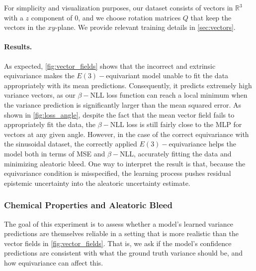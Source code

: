 \documentclass[10pt]{article} %
\theoremstyle{definition}
\begin{document}
For simplicity and visualization purposes,  our dataset consists of vectors in $\mathbb{R}^3$ with a $z$ component of $0$, and we choose rotation matrices $Q$ that keep the vectors in the $xy$-plane. We provide relevant training details in \cref{sec:vectors}.

\paragraph{Results.} As expected, \cref{fig:vector_fields} shows that the incorrect and extrinsic equivariance makes the $E(3)-$equivariant model unable to fit the data appropriately with its mean predictions. Consequently, it predicts extremely high variance vectors, as our $\beta-$NLL loss function can reach a local minimum when the variance prediction is significantly larger than the mean squared error. As shown in \cref{fig:loss_angle}, despite the fact that the mean vector field fails to appropriately fit the data, the $\beta-$NLL loss is still fairly close to the MLP for vectors at any given angle. However, in the case of the correct equivariance with the sinusoidal dataset, the correctly applied $E(3)-$equivariance helps the model both in terms of MSE and $\beta-$NLL, accurately fitting the data and minimizing aleatoric bleed. One way to interpret the result is that, because the equivariance condition is misspecified, the learning process pushes residual epistemic uncertainty into the aleatoric uncertainty estimate.

\subsubsection{Chemical Properties and Aleatoric Bleed} \label{sec:chemica} The goal of this experiment is to assess whether a model's learned variance predictions are themselves reliable in a setting that is more realistic than the vector fields in \cref{fig:vector_fields}. That is, we ask if the model's confidence predictions are consistent with what the ground truth variance should be, and how equivariance can affect this. 
\end{document}
